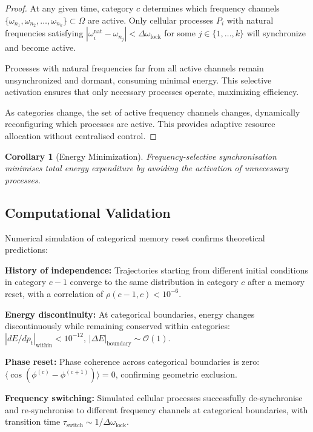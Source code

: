 \documentclass[11pt,twocolumn,a4paper]{article}
\newtheorem{corollary}[theorem]{Corollary}
\theoremstyle{definition}
\theoremstyle{remark}
\newcommand{\omegalock}{\Delta\omega_{\mathrm{lock}}}
\begin{document}
\begin{proof}
At any given time, category $c$ determines which frequency channels $\{\omega_{n_1}, \omega_{n_2}, \ldots, \omega_{n_k}\} \subset \Omega$ are active. Only cellular processes $P_i$ with natural frequencies satisfying $|\omega_i^{\mathrm{nat}} - \omega_{n_j}| < \omegalock$ for some $j \in \{1,\ldots,k\}$ will synchronize and become active.

Processes with natural frequencies far from all active channels remain unsynchronized and dormant, consuming minimal energy. This selective activation ensures that only necessary processes operate, maximizing efficiency.

As categories change, the set of active frequency channels changes, dynamically reconfiguring which processes are active. This provides adaptive resource allocation without centralised control.
\end{proof}

\begin{corollary}[Energy Minimization]
\label{cor:energy_minimization}
Frequency-selective synchronisation minimises total energy expenditure by avoiding the activation of unnecessary processes.
\end{corollary}

\subsection{Computational Validation}

Numerical simulation of categorical memory reset confirms theoretical predictions:

\textbf{History of independence:} Trajectories starting from different initial conditions in category $c-1$ converge to the same distribution in category $c$ after a memory reset, with a correlation of $\rho(c-1, c) < 10^{-6}$.

\textbf{Energy discontinuity:} At categorical boundaries, energy changes discontinuously while remaining conserved within categories: $|dE/dp_t|_{\text{within}} < 10^{-12}$, $|\Delta E|_{\text{boundary}} \sim \mathcal{O}(1)$.

\textbf{Phase reset:} Phase coherence across categorical boundaries is zero: $\langle \cos(\phi^{(c)} - \phi^{(c+1)})\rangle = 0$, confirming geometric exclusion.

\textbf{Frequency switching:} Simulated cellular processes successfully de-synchronise and re-synchronise to different frequency channels at categorical boundaries, with transition time $\tau_{\text{switch}} \sim 1/\omegalock$.
\end{document}
